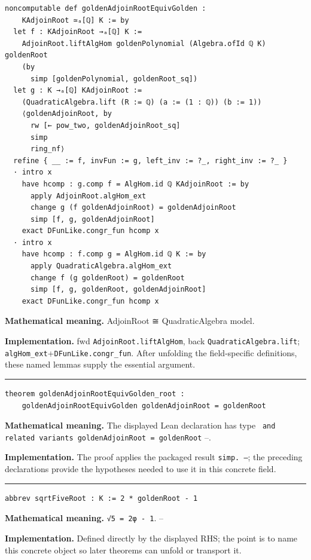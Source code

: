 \documentclass[UTF8,a4paper,11pt,fontset=fandol]{ctexart}
\theoremstyle{definition}
\newcommand{\statementsep}{\par\medskip\hrule\medskip}
\begin{document}
\begin{verbatim}
noncomputable def goldenAdjoinRootEquivGolden :
    KAdjoinRoot ≃ₐ[ℚ] K := by
  let f : KAdjoinRoot →ₐ[ℚ] K :=
    AdjoinRoot.liftAlgHom goldenPolynomial (Algebra.ofId ℚ K) goldenRoot
    (by
      simp [goldenPolynomial, goldenRoot_sq])
  let g : K →ₐ[ℚ] KAdjoinRoot :=
    (QuadraticAlgebra.lift (R := ℚ) (a := (1 : ℚ)) (b := 1))
    ⟨goldenAdjoinRoot, by
      rw [← pow_two, goldenAdjoinRoot_sq]
      simp
      ring_nf⟩
  refine { __ := f, invFun := g, left_inv := ?_, right_inv := ?_ }
  · intro x
    have hcomp : g.comp f = AlgHom.id ℚ KAdjoinRoot := by
      apply AdjoinRoot.algHom_ext
      change g (f goldenAdjoinRoot) = goldenAdjoinRoot
      simp [f, g, goldenAdjoinRoot]
    exact DFunLike.congr_fun hcomp x
  · intro x
    have hcomp : f.comp g = AlgHom.id ℚ K := by
      apply QuadraticAlgebra.algHom_ext
      change f (g goldenRoot) = goldenRoot
      simp [f, g, goldenRoot, goldenAdjoinRoot]
    exact DFunLike.congr_fun hcomp x
\end{verbatim}
\noindent\textbf{Mathematical meaning.} AdjoinRoot ≅ QuadraticAlgebra model.\par
\noindent\textbf{Implementation.} fwd \texttt{AdjoinRoot.\allowbreak{}liftAlgHom}, back \texttt{QuadraticAlgebra.\allowbreak{}lift}; \texttt{algHom\_\allowbreak{}ext}+\texttt{DFunLike.\allowbreak{}congr\_\allowbreak{}fun}. After unfolding the field-specific definitions, these named lemmas supply the essential argument.\par
\statementsep
\begin{verbatim}
theorem goldenAdjoinRootEquivGolden_root :
    goldenAdjoinRootEquivGolden goldenAdjoinRoot = goldenRoot
\end{verbatim}
\noindent\textbf{Mathematical meaning.} The displayed Lean declaration has type \texttt{ and related variants goldenAdjoinRoot = goldenRoot} --.\par
\noindent\textbf{Implementation.} The proof applies the packaged result \texttt{simp.\allowbreak{} --}; the preceding declarations provide the hypotheses needed to use it in this concrete field.\par
\statementsep
\begin{verbatim}
abbrev sqrtFiveRoot : K := 2 * goldenRoot - 1
\end{verbatim}
\noindent\textbf{Mathematical meaning.} \texttt{√5 = 2φ - 1}. --\par
\noindent\textbf{Implementation.} Defined directly by the displayed RHS; the point is to name this concrete object so later theorems can unfold or transport it.\par
\end{document}
